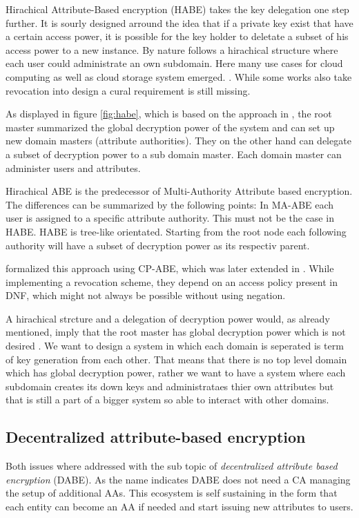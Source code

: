 Hirachical Attribute-Based encryption (HABE) takes the key delegation one step further. It is sourly designed arround the idea that if a private key exist that have a certain access power, it is possible for the key holder to deletate a subset of his access power to a new instance. By nature follows a hirachical structure where each user could administrate an own subdomain. Here many use cases for cloud computing as well as cloud storage system emerged. \cite{Wang:2010:HAE:1866307.1866414}. While some works also take revocation into design a cural requirement is still missing.

As displayed in figure \ref{fig:habe}, which is based on the approach in \cite{wang2011hierarchical}, the root master summarized the global decryption power of the system and can set up new domain masters (attribute authorities). They on the other hand can delegate a subset of decryption power to a sub domain master. Each domain master can administer users and attributes.

Hirachical ABE is the predecessor of Multi-Authority Attribute based encryption. The differences can be summarized by the following points: In MA-ABE each user is assigned to a specific attribute authority. This must not be the case in HABE. HABE is tree-like orientated. Starting from the root node each following authority will have a subset of decryption power as its respectiv parent. 

\cite{Wang:2010:HAE:1866307.1866414} formalized this approach using CP-ABE, which was later extended in \cite{wang2011hierarchical}. While implementing a revocation scheme, they depend on an access policy present in DNF, which might not always be possible without using negation. 

A hirachical strcture and a delegation of decryption power would, as already mentioned, imply that the root master has global decryption power which is not desired . We want to design a system in which each domain is seperated is term of key generation from each other. That means that there is no top level domain which has global decryption power, rather we want to have a system where each subdomain creates its down keys and administrataes thier own attributes but that is still a part of a bigger system so able to interact with other domains.  

\subsection{Decentralized attribute-based encryption}
\label{sec:DABE}
Both issues where addressed with the sub topic of \textit{decentralized attribute based encryption} (DABE). As the name indicates DABE does not need a CA managing the setup of additional AAs. This ecosystem is self sustaining in the form that each entity can become an AA if needed and start issuing new attributes to users. 

